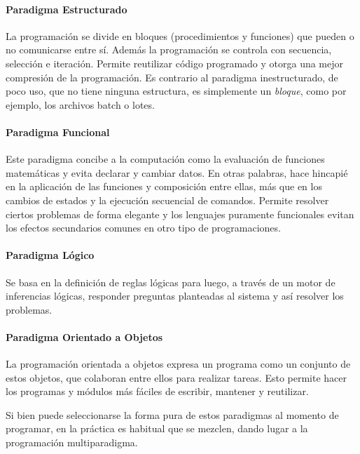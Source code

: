 \documentclass[12pt,legalpaper]{report}
\begin{document}
					\paragraph{Paradigma Estructurado}

La programación se divide en bloques (procedimientos y funciones) que pueden o no comunicarse entre sí. Además la programación se controla con secuencia, selección e iteración. Permite reutilizar código programado y otorga una mejor compresión de la programación. Es contrario al paradigma inestructurado, de poco uso, que no tiene ninguna estructura, es simplemente un \textit{bloque}, como por ejemplo, los archivos batch o lotes.
				
					\paragraph{Paradigma Funcional}
				 
Este paradigma concibe a la computación como la evaluación de funciones matemáticas y evita declarar y cambiar datos. En otras palabras, hace hincapié en la aplicación de las funciones y composición entre ellas, más que en los cambios de estados y la ejecución secuencial de comandos. Permite resolver ciertos problemas de forma elegante y los lenguajes puramente funcionales evitan los efectos secundarios comunes en otro tipo de programaciones.
	
					\paragraph{Paradigma Lógico}
				
Se basa en la definición de reglas lógicas para luego, a través de un motor de inferencias lógicas, responder preguntas planteadas al sistema y así resolver los problemas.

	
					\paragraph{Paradigma Orientado a Objetos}
				
La programación orientada a objetos expresa un programa como un conjunto de estos objetos, que colaboran entre ellos para realizar tareas. Esto permite hacer los programas y módulos más fáciles de escribir, mantener y reutilizar.


Si bien puede seleccionarse la forma pura de estos paradigmas al momento de programar, en la práctica es habitual que se mezclen, dando lugar a la programación multiparadigma.
\end{document}
